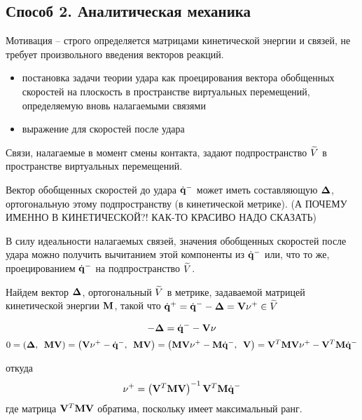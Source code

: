 
\subsection{Способ 2. Аналитическая механика}

Мотивация -- строго определяется матрицами кинетической энергии и связей, не требует произвольного введения векторов реакций.

\begin{itemize}
    \item постановка задачи теории удара как проецирования вектора обобщенных скоростей на плоскость в пространстве виртуальных перемещений, определяемую вновь налагаемыми связями
    \item выражение для скоростей после удара
\end{itemize}

Связи, налагаемые в момент смены контакта, задают подпространство $\widetilde{V}$ в пространстве виртуальных перемещений.

Вектор обобщенных скоростей до удара $\dot{\mathbf{q}}^-$ может иметь составляющую $\mathbf{\Delta}$, ортогональную этому подпространству (в кинетической метрике). (А ПОЧЕМУ ИМЕННО В КИНЕТИЧЕСКОЙ?! КАК-ТО КРАСИВО НАДО СКАЗАТЬ)

В силу идеальности налагаемых связей, значения обобщенных скоростей после удара можно получить вычитанием этой компоненты из $\dot{\mathbf{q}}^-$ или, что то же, проецированием $\dot{\mathbf{q}}^-$ на подпространство $\widetilde{V}$.

Найдем вектор $\mathbf{\Delta}$, ортогональный $\widetilde{V}$ в метрике, задаваемой матрицей кинетической энергии $\mathbf{M}$, такой что $\dot{\mathbf{q}}^+ = \dot{\mathbf{q}}^- - \mathbf{\Delta} = \mathbf{V}\mathbf{\nu}^+ \in \widetilde{V}$

\begin{equation*}
-\deltadq = \dqdo - \cstr\nu \newline
\end{equation*}
\begin{equation*}
0 = \left( \mathbf{\Delta}, \enspace \mathbf{M}\mathbf{V} \right) = \left( \mathbf{V}\mathbf{\nu}^+ - \dot{\mathbf{q}}^-, \enspace \mathbf{M}\mathbf{V} \right) = \left( \mathbf{M}\mathbf{V}\mathbf{\nu}^+ - \mathbf{M}\dot{\mathbf{q}}^-, \enspace \mathbf{V} \right) = \mathbf{V}^T\mathbf{M}\mathbf{V}\mathbf{\nu}^+ - \mathbf{V}^T\mathbf{M}\dot{\mathbf{q}}^- 
\end{equation*}

откуда
\begin{equation*}
\mathbf{\nu}^+ = \left( \mathbf{V}^T\mathbf{M}\mathbf{V} \right)^{-1}\mathbf{V}^T\mathbf{M}\dot{\mathbf{q}}^-
\end{equation*}
где матрица $\mathbf{V}^T\mathbf{M}\mathbf{V}$ обратима, поскольку имеет максимальный ранг.